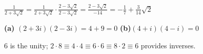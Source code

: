 \documentclass[12pt]{book}
\theoremstyle{definition}
\providecommand\phantomsection{}
\begin{document}
\begin{oddenumerate}
	\item $ \frac{1}{2+3\sqrt{2}}= \frac{1}{2+3\sqrt{2}}\cdot\frac{2-3\sqrt{2}}{2-3\sqrt{2}}=\frac{2-3\sqrt{2}}{-14} =-\frac{1}{7}+\frac{3}{14}\sqrt{2}$
	
	\item \textbf{(a)} $ (2+3i)(2-3i)=4+9=0 $ \textbf{(b)}$ (4+i)(4-i)=0 $
	
	\item 6 is the unity; $ 2\cdot 8\equiv 4\cdot4 \equiv 6\cdot6\equiv 8\cdot 2 \equiv 6 $ provides inverses. 
	
	
	
	
\end{oddenumerate}
\backmatter

\printindex



% 
% 
% 
% 
% 
% 
% 
\end{document}
